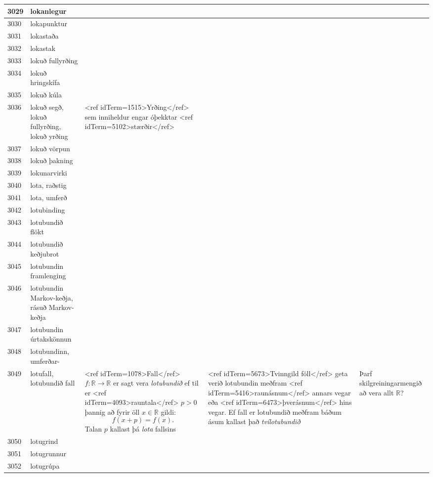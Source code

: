 \begin{longtable}{p{}|p{}|p{}|p{}|p{}}
\hline
3029 & lokanlegur &  &  &  \\
\hline
3030 & lokapunktur &  &  &  \\
\hline
3031 & lokastaða &  &  &  \\
\hline
3032 & lokastak &  &  &  \\
\hline
3033 & lokuð fullyrðing &  &  &  \\
\hline
3034 & lokuð hringskífa &  &  &  \\
\hline
3035 & lokuð kúla &  &  &  \\
\hline
3036 & lokuð segð, lokuð fullyrðing, lokuð yrðing & <ref idTerm=1515>Yrðing</ref> sem inniheldur engar óþekktar <ref idTerm=5102>stærðir</ref> &  &  \\
\hline
3037 & lokuð vörpun &  &  &  \\
\hline
3038 & lokuð þakning &  &  &  \\
\hline
3039 & lokunarvirki &  &  &  \\
\hline
3040 & lota, raðstig &  &  &  \\
\hline
3041 & lota, umferð &  &  &  \\
\hline
3042 & lotubinding &  &  &  \\
\hline
3043 & lotubundið flökt &  &  &  \\
\hline
3044 & lotubundið keðjubrot &  &  &  \\
\hline
3045 & lotubundin framlenging &  &  &  \\
\hline
3046 & lotubundin Markov-keðja, rásuð Markov-keðja &  &  &  \\
\hline
3047 & lotubundin úrtakskönnun &  &  &  \\
\hline
3048 & lotubundinn, umferðar- &  &  &  \\
\hline
3049 & lotufall, lotubundið fall & <ref idTerm=1078>Fall</ref> $f: \mathbb{R} \to \mathbb{R}$ er sagt vera \textit{lotubundið} ef til er <ref idTerm=4093>rauntala</ref> $p > 0$ þannig að fyrir öll $x \in \mathbb{R}$ gildi: \[ f(x + p) = f(x). \] Talan $p$ kallast þá \textit{lota} fallsins & <ref idTerm=5673>Tvinngild föll</ref> geta verið lotubundin meðfram <ref idTerm=5416>raunásnum</ref> annars vegar eða <ref idTerm=6473>þverásnum</ref> hins vegar. Ef fall er lotubundið meðfram báðum ásum kallast það \textit{tvílotubundið} & Þarf skilgreiningarmengið að vera allt $\mathbb{R}$? \\
\hline
3050 & lotugrind &  &  &  \\
\hline
3051 & lotugrunnur &  &  &  \\
\hline
3052 & lotugrúpa &  &  &  \\

\end{longtable}
